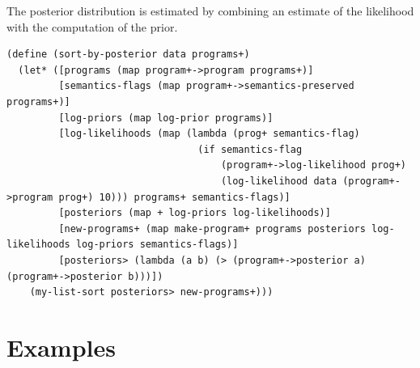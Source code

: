 \documentclass[a4paper,10pt]{article}
\begin{document}
The posterior distribution is estimated by combining an estimate of the likelihood with the computation of the prior.  
\begin{lstlisting}[frame=trbl]
(define (sort-by-posterior data programs+)
  (let* ([programs (map program+->program programs+)]
         [semantics-flags (map program+->semantics-preserved programs+)]
         [log-priors (map log-prior programs)]
         [log-likelihoods (map (lambda (prog+ semantics-flag)
                                 (if semantics-flag
                                     (program+->log-likelihood prog+)
                                     (log-likelihood data (program+->program prog+) 10))) programs+ semantics-flags)]
         [posteriors (map + log-priors log-likelihoods)] 
         [new-programs+ (map make-program+ programs posteriors log-likelihoods log-priors semantics-flags)]
         [posteriors> (lambda (a b) (> (program+->posterior a) (program+->posterior b)))])
    (my-list-sort posteriors> new-programs+)))
\end{lstlisting}


\newpage
\section{Examples}
\end{document}
